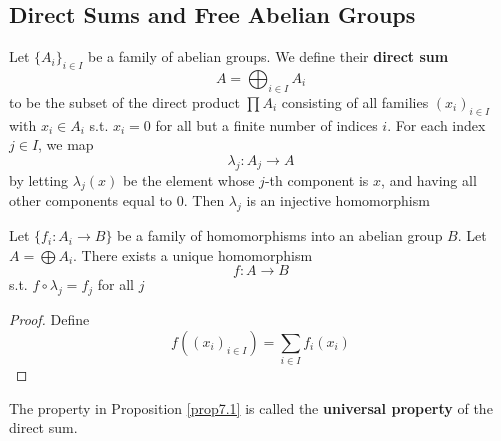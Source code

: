 \documentclass[11pt]{article}
\begin{document}
\subsection{Direct Sums and Free Abelian Groups}
\label{sec:orgdd4d840}
Let \(\{A_i\}_{i\in I}\) be a family of abelian groups. We define their \textbf{direct sum}
\begin{equation*}
A=\bigoplus_{i\in I}A_i
\end{equation*}
to be the subset of the direct product \(\prod A_i\) consisting of all families \((x_i)_{i\in I}\)
with \(x_i\in A_i\) s.t. \(x_i=0\) for all but a finite number of indices \(i\). For each
index \(j\in I\), we map
\begin{equation*}
\lambda_j:A_j\to A
\end{equation*}
by letting \(\lambda_j(x)\) be the element whose \(j\)-th component is \(x\), and having all other
components equal to 0. Then \(\lambda_j\) is an injective homomorphism

\begin{proposition}[]
\label{prop7.1}
Let \(\{f_i:A_i\to B\}\) be a family of homomorphisms into an abelian group \(B\). Let \(A=\bigoplus A_i\).
There exists a unique homomorphism
\begin{equation*}
f:A\to B
\end{equation*}
s.t. \(f\circ\lambda_j=f_j\) for all \(j\)
\end{proposition}

\begin{proof}
Define
\begin{equation*}
f((x_i)_{i\in I})=\sum_{i\in I}f_i(x_i)
\end{equation*}
\end{proof}

The property in Proposition \ref{prop7.1} is called the \textbf{universal property} of the direct sum.
\end{document}
